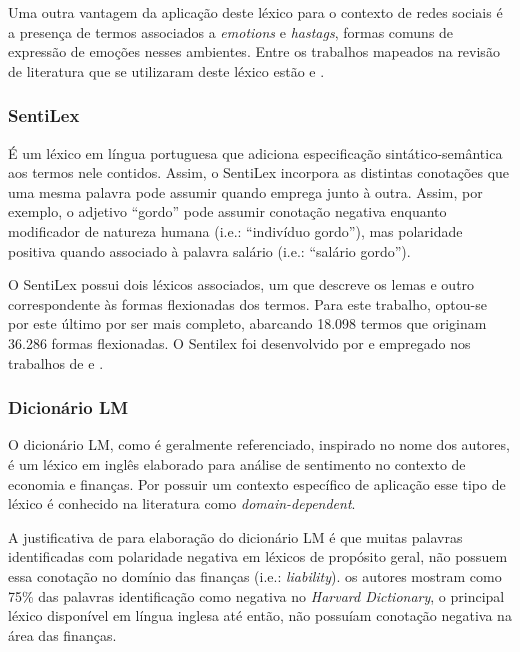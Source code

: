 Uma outra vantagem da aplicação deste léxico para o contexto de redes sociais é a presença de termos associados a \textit{emotions} e \textit{hastags}, formas comuns de expressão de emoções nesses ambientes. Entre os trabalhos mapeados na revisão de literatura que se utilizaram deste léxico estão \textcite{avanco_lexicon-based_2014} e \textcite{de_melo_sentilexbr_2022}.

\bigskip
\subsubsection{SentiLex}

É um léxico em língua portuguesa que adiciona especificação sintático-semântica aos termos nele contidos. Assim, o SentiLex incorpora as distintas conotações que uma mesma palavra pode assumir quando emprega junto à outra. Assim, por exemplo, o adjetivo \enquote{gordo} pode assumir conotação negativa enquanto modificador de natureza humana (i.e.: \enquote{indivíduo gordo}), mas polaridade positiva quando associado à palavra salário (i.e.: \enquote{salário gordo}).

O SentiLex possui dois léxicos associados, um que descreve os lemas e outro correspondente às formas flexionadas dos termos. Para este trabalho, optou-se por este último por ser mais completo, abarcando 18.098 termos que originam 36.286 formas flexionadas. O Sentilex foi desenvolvido por \textcite{carvalho_sentilex-pt_2015} e empregado nos trabalhos de \textcite{avanco_lexicon-based_2014} e \textcite{januario_sentiment_2022}. 

\bigskip
\subsubsection{Dicionário LM}

O dicionário LM, como é geralmente referenciado, inspirado no nome dos autores, \textcite{loughran_when_2010} é um léxico em inglês elaborado para análise de sentimento no contexto de economia e finanças. Por possuir um contexto específico de aplicação esse tipo de léxico é conhecido na literatura como \textit{domain-dependent}.

A justificativa de \textcite{loughran_when_2010}
para elaboração do dicionário LM é que muitas palavras identificadas com polaridade negativa em léxicos de propósito geral, não possuem essa conotação no domínio das finanças (i.e.: \textit{liability}). os autores mostram como 75\% das palavras identificação como negativa no \textit{Harvard Dictionary}, o principal léxico disponível em língua inglesa até então, não possuíam conotação negativa na área das finanças. 

